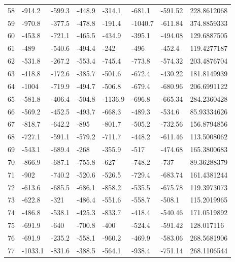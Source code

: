 \begin{table}[h]
\begin{tabular}{llllllll}
58      & -914.2  & -599.3  & -448.9  & -314.1  & -681.1  & -591.52  & 228.8612068        \\
59      & -970.8  & -377.5  & -478.8  & -191.4  & -1040.7 & -611.84  & 374.8859333        \\
60      & -453.8  & -721.1  & -465.5  & -434.9  & -395.1  & -494.08  & 129.6887505        \\
61      & -489    & -540.6  & -494.4  & -242    & -496    & -452.4   & 119.4277187        \\
62      & -531.8  & -267.2  & -553.4  & -745.4  & -773.8  & -574.32  & 203.4876704        \\
63      & -418.8  & -172.6  & -385.7  & -501.6  & -672.4  & -430.22  & 181.8149939        \\
64      & -1004   & -719.9  & -494.7  & -506.8  & -679.4  & -680.96  & 206.6991122        \\
65      & -581.8  & -406.4  & -504.8  & -1136.9 & -696.8  & -665.34  & 284.2360428        \\
66      & -569.2  & -452.5  & -493.7  & -668.3  & -489.3  & -534.6   & 85.93334626        \\
67      & -818.7  & -642.2  & -895    & -801.7  & -505.2  & -732.56  & 156.8794856        \\
68      & -727.1  & -591.1  & -579.2  & -711.7  & -448.2  & -611.46  & 113.5008062        \\
69      & -543.1  & -689.4  & -268    & -355.9  & -517    & -474.68  & 165.3800683        \\
70      & -866.9  & -687.1  & -755.8  & -627    & -748.2  & -737     & 89.36288379        \\
71      & -902    & -740.2  & -520.6  & -526.5  & -729.4  & -683.74  & 161.4381244        \\
72      & -613.6  & -685.5  & -686.1  & -858.2  & -535.5  & -675.78  & 119.3973073        \\
73      & -622.8  & -321    & -486.4  & -551.6  & -558.7  & -508.1   & 115.2019965        \\
74      & -486.8  & -538.1  & -425.3  & -833.7  & -418.4  & -540.46  & 171.0519892        \\
75      & -691.9  & -640    & -700.8  & -400    & -524.4  & -591.42  & 128.017116         \\
76      & -691.9  & -235.2  & -558.1  & -960.2  & -469.9  & -583.06  & 268.5681906        \\
77      & -1033.1 & -831.6  & -388.5  & -564.1  & -938.4  & -751.14  & 268.1106544        \\

\end{tabular}
\end{table}
